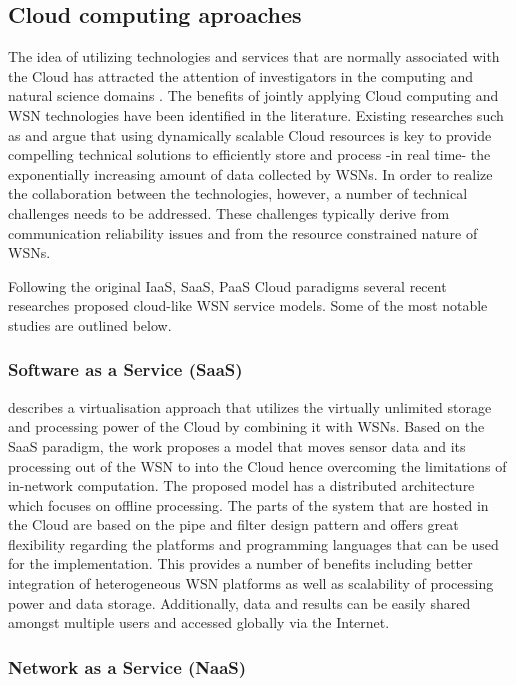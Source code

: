 \subsection{Cloud computing aproaches}
The idea of utilizing technologies and services that are normally associated with the Cloud has attracted the attention of investigators in the computing and natural science domains \cite{Kurschl:2009:CCC:1806338.1806435,ahmed2011integrating,rolim2010cloud}. The benefits of jointly applying Cloud computing and WSN technologies have been identified in the literature. Existing researches such as \cite{liu2011opportunities} and \cite{hassan2009framework} argue that using dynamically scalable Cloud resources is key to provide compelling technical solutions to efficiently store and process -in real time- the exponentially increasing amount of data collected by WSNs. In order to realize the collaboration between the technologies, however, a number of technical challenges needs to be addressed. These challenges typically derive from communication reliability issues and from the resource constrained nature of WSNs.

Following the original IaaS, SaaS, PaaS Cloud paradigms \cite{lenk2009s} several recent researches proposed cloud-like WSN service models. Some of the most notable studies are outlined below.

\subsubsection{Software as a Service (SaaS)}
\cite{Kurschl:2009:CCC:1806338.1806435} describes a virtualisation approach that utilizes the virtually unlimited storage and processing power of the Cloud by combining it with WSNs. Based on the SaaS paradigm, the work proposes a model that moves sensor data and its processing out of the WSN to into the Cloud hence overcoming the limitations of in-network computation. The proposed model has a distributed architecture which focuses on offline processing. The parts of the system that are hosted in the Cloud are based on the pipe and filter design pattern and offers great flexibility regarding the platforms and programming languages that can be used for the implementation. This provides a number of benefits including
better integration of heterogeneous WSN platforms as well as scalability of processing power and data storage.  Additionally, data and results can be easily shared amongst multiple users and accessed globally via the Internet.

\subsubsection{Network as a Service (NaaS)}

